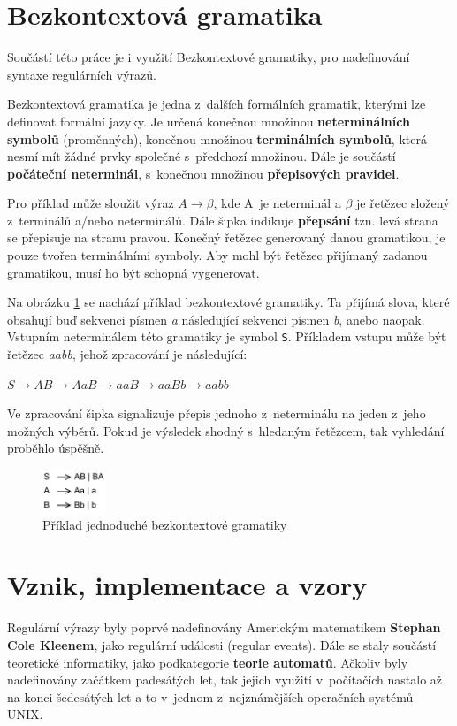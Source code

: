 \section{Bezkontextová gramatika}
Součástí této práce je i využití Bezkontextové gramatiky, pro nadefinování syntaxe regulárních výrazů.

Bezkontextová gramatika je jedna z~dalších formálních gramatik, kterými lze definovat formální jazyky. 
Je určená konečnou množinou \textbf{neterminálních symbolů} (proměnných), konečnou množinou \textbf{terminálních symbolů}, která nesmí mít žádné prvky společné s~předchozí množinou.
Dále je součástí \textbf{počáteční neterminál}, s~konečnou množinou \textbf{přepisových pravidel}\cite{MUNIFL}.

Pro příklad může sloužit výraz $A \longrightarrow \beta$, kde A~je neterminál a $\beta$ je řetězec složený z~terminálů a/nebo neterminálů. 
Dále šipka indikuje \textbf{přepsání} tzn. levá strana se přepisuje na stranu pravou.
Konečný řetězec generovaný danou gramatikou, je pouze tvořen terminálními symboly.
Aby mohl být řetězec přijímaný zadanou gramatikou, musí ho být schopná vygenerovat.

Na obrázku \ref{fig:CFG} se nachází příklad bezkontextové gramatiky.
Ta přijímá slova, které obsahují buď sekvenci písmen \textit{a} následující sekvenci písmen \textit{b}, anebo naopak.
Vstupním neterminálem této gramatiky je symbol \texttt{S}.
Příkladem vstupu může být řetězec \textit{aabb}, jehož zpracování je následující:

\texttt{$S \rightarrow AB \rightarrow AaB \rightarrow aaB \rightarrow aaBb \rightarrow aabb$}

Ve zpracování šipka signalizuje přepis jednoho z~neterminálu na jeden z~jeho možných výběrů.
Pokud je výsledek shodný s~hledaným řetězcem, tak vyhledání proběhlo úspěšně.

\begin{figure}[!h]
	\centering
	\includegraphics[width=0.17\textwidth]{Figures/CFG.pdf}
	\caption{Příklad jednoduché bezkontextové gramatiky}
	\label{fig:CFG}
\end{figure}


\section{Vznik, implementace a vzory}
Regulární výrazy byly poprvé nadefinovány Americkým matematikem \textbf{Stephan Cole Kleenem}, jako regulární události (regular events)\cite{Leung_2010, Kleene_1951}. 
Dále se staly součástí teoretické informatiky, jako podkategorie \textbf{teorie automatů}.
Ačkoliv byly nadefinovány začátkem padesátých let, tak jejich využití v~počítačích nastalo až na konci šedesátých let a to v~jednom z~nejznámějších operačních systémů UNIX.

